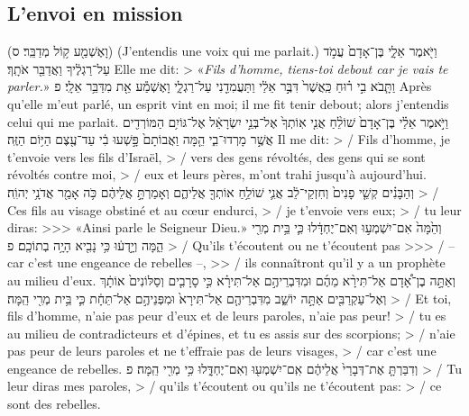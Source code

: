 \begin{paracol}[1]
  \subsection*{L'envoi en mission}
  \horsverset
  {(וָאֶשְׁמַ֖ע ק֥וֹל מְדַבֵּֽר׃ ס)}
  {(J'entendis une voix qui me parlait.)}
  \verset
  {וַיֹּ֖אמֶר אֵלָ֑י
    בֶּן־אָדָם֙ עֲמֹ֣ד עַל־רַגְלֶ֔יךָ וַאֲדַבֵּ֖ר אֹתָֽךְ׃}
  {Elle me dit:
    > «\textit{Fils d’homme, tiens-toi debout car je vais te parler.}»}
  \verset
  {וַתָּ֧בֹא בִ֣י ר֗וּחַ כַּֽאֲשֶׁר֙ דִּבֶּ֣ר אֵלַ֔י
    וַתַּעֲמִדֵ֖נִי עַל־רַגְלָ֑י
    וָאֶשְׁמַ֕ע אֵ֖ת מִדַּבֵּ֥ר אֵלָֽי׃ פ}
  {Après qu’elle m’eut parlé, un esprit vint en moi;
    il me fit tenir debout;
    alors j’entendis celui qui me parlait.}
  \verset
  {וַיֹּ֣אמֶר אֵלַ֗י
    בֶּן־אָדָם֙ שׁוֹלֵ֨חַ אֲנִ֤י אֽוֹתְךָ֙ אֶל־בְּנֵ֣י יִשְׂרָאֵ֔ל
    אֶל־גּוֹיִ֥ם הַמּוֹרְדִ֖ים אֲשֶׁ֣ר מָרְדוּ־בִ֑י
    הֵ֤מָּה וַאֲבוֹתָם֙ פָּ֣שְׁעוּ בִ֔י עַד־עֶ֖צֶם הַיּ֥וֹם הַזֶּֽה׃}
  {Il me dit:
    > / Fils d’homme, je t’envoie vers les fils d’Israël,
    > / vers des gens révoltés, des gens qui se sont révoltés contre moi,
    > / eux et leurs pères, m'ont trahi jusqu’à aujourd’hui.}
  \verset
  {וְהַבָּנִ֗ים קְשֵׁ֤י פָנִים֙ וְחִזְקֵי־לֵ֔ב
    אֲנִ֛י שׁוֹלֵ֥חַ אוֹתְךָ֖ אֲלֵיהֶ֑ם
    וְאָמַרְתָּ֣ אֲלֵיהֶ֔ם
    כֹּ֥ה אָמַ֖ר אֲדֹנָ֥י יְהוִֹֽה׃}
  {> / Ces fils au visage obstiné et au cœur endurci,
    > / je t’envoie vers eux;
    > / tu leur diras:
    >>> «Ainsi parle le Seigneur Dieu.»}
  \verset
  {וְהֵ֙מָּה֙ אִם־יִשְׁמְע֣וּ וְאִם־יֶחְדָּ֔לוּ
    כִּ֛י בֵּ֥ית מְרִ֖י הֵ֑מָּה
    וְיָ֣דְע֔וּ כִּ֥י נָבִ֖יא הָיָ֥ה בְתוֹכָֽם׃ פ}
  {> / Qu’ils t’écoutent ou ne t’écoutent pas
    >>> / – car c’est une engeance de rebelles –,
    >> / ils connaîtront qu’il y a un prophète au milieu d’eux.}
  \verseSpace
  \verset
  {וְאַתָּ֣ה בֶן־אָ֠דָם אַל־תִּירָ֨א מֵהֶ֜ם וּמִדִּבְרֵיהֶ֣ם אַל־תִּירָ֗א
    כִּ֣י סָרָבִ֤ים וְסַלּוֹנִים֙ אוֹתָ֔ךְ וְאֶל־עַקְרַבִּ֖ים אַתָּ֣ה יוֹשֵׁ֑ב
    מִדִּבְרֵיהֶ֤ם אַל־תִּירָא֙ וּמִפְּנֵיהֶ֣ם אַל־תֵּחָ֔ת
    כִּ֛י בֵּ֥ית מְרִ֖י הֵֽמָּה׃}
  {> / Et toi, fils d’homme, n’aie pas peur d’eux et de leurs paroles, n’aie pas peur!
    > / tu es au milieu de contradicteurs et d’épines, et tu es assis sur des scorpions;
    > / n’aie pas peur de leurs paroles et ne t’effraie pas de leurs visages,
    > / car c’est une engeance de rebelles.}
  \verset
  {וְדִבַּרְתָּ֤ אֶת־דְּבָרַי֙ אֲלֵיהֶ֔ם
    אִֽם־יִשְׁמְע֖וּ וְאִם־יֶחְדָּ֑לוּ
    כִּ֥י מְרִ֖י הֵֽמָּה׃ פ}
  {> / Tu leur diras mes paroles,
    > / qu’ils t’écoutent ou qu’ils ne t’écoutent pas:
    > / ce sont des rebelles.}
  \verseSpace
  \verset

\end{paracol}
